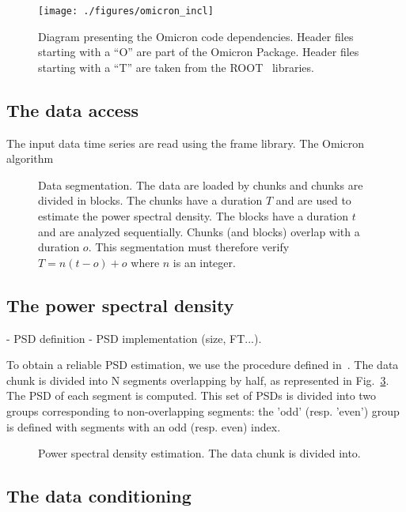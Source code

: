 \begin{figure}
  \center
  \texttt{[image: ./figures/omicron\_incl]}
  \caption{Diagram presenting the Omicron code dependencies. Header files starting with a ``O'' are part of the Omicron Package. Header files starting with a ``T'' are taken from the ROOT~\cite{Brun:1997pa} libraries. }
  \label{fig:omicron_incl}
\end{figure}




\subsection{The data access} \label{sec:algorithm:data}
The input data time series are read using the frame library. The Omicron algorithm

\begin{figure}
  \center
  \caption{Data segmentation. The data are loaded by chunks and chunks are divided in blocks. The chunks have a duration $T$ and are used to estimate the power spectral density. The blocks have a duration $t$ and are analyzed sequentially. Chunks (and blocks) overlap with a duration $o$. This segmentation must therefore verify $T=n(t-o)+o$ where $n$ is an integer.}
  \label{fig:segmentation}
\end{figure}

\subsection{The power spectral density} \label{sec:algorithm:psd}
- PSD definition - PSD implementation (size, FT...).

To obtain a reliable PSD estimation, we use the procedure defined in~\cite{psd}.
The data chunk is divided into N segments overlapping by half, as represented in Fig.~\ref{fig:mmm}. The PSD of each segment is computed. This set of PSDs is divided into two groups corresponding to non-overlapping segments: the 'odd' (resp. 'even') group is defined with segments with an odd (resp. even) index.
\begin{figure}
  \center
  \caption{Power spectral density estimation. The data chunk is divided into.}
  \label{fig:mmm}
\end{figure}

\subsection{The data conditioning} \label{sec:algorithm:conditioning}

